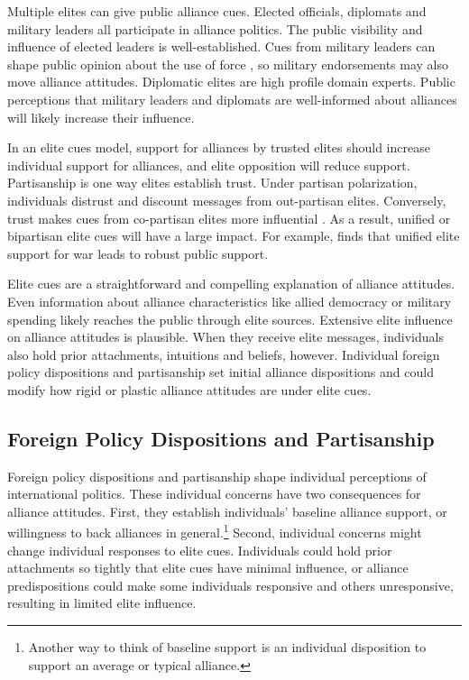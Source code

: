 \documentclass[12pt]{article}
\begin{document}
Multiple elites can give public alliance cues.
Elected officials, diplomats and military leaders all participate in alliance politics.
The public visibility and influence of elected leaders is well-established.  
Cues from military leaders can shape public opinion about the use of force \citep{Golbyetal2018}, so military endorsements may also move alliance attitudes. 
Diplomatic elites are high profile domain experts. 
Public perceptions that military leaders and diplomats are well-informed about alliances will likely increase their influence. 


In an elite cues model, support for alliances by trusted elites should increase individual support for alliances, and elite opposition will reduce support.   
Partisanship is one way elites establish trust.
Under partisan polarization, individuals distrust and discount messages from out-partisan elites. 
Conversely, trust makes cues from co-partisan elites more influential \citep{Druckmanetal2013}.
As a result, unified or bipartisan elite cues will have a large impact.
For example, \citet{Berinsky2007} finds that unified elite support for war leads to robust public support. 


Elite cues are a straightforward and compelling explanation of alliance attitudes.
Even information about alliance characteristics like allied democracy or military spending likely reaches the public through elite sources. 
Extensive elite influence on alliance attitudes is plausible. 
When they receive elite messages, individuals also hold prior attachments, intuitions and beliefs, however.
Individual foreign policy dispositions and partisanship set initial alliance dispositions and could modify how rigid or plastic alliance attitudes are under elite cues. 


\subsection{Foreign Policy Dispositions and Partisanship}


Foreign policy dispositions and partisanship shape individual perceptions of international politics. 
These individual concerns have two consequences for alliance attitudes. 
First, they establish individuals' baseline alliance support, or willingness to back alliances in general.\footnote{Another way to think of baseline support is an individual disposition to support an average or typical alliance.} 
Second, individual concerns might change individual responses to elite cues. 
Individuals could hold prior attachments so tightly that elite cues have minimal influence, or alliance predispositions could make some individuals responsive and others unresponsive, resulting in limited elite influence.
\end{document}
